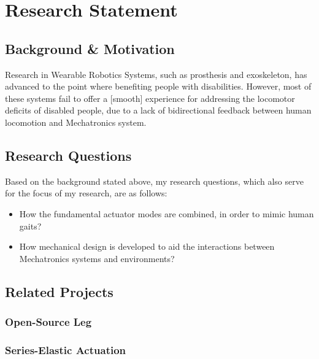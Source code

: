 \documentclass[12pt]{article}
\begin{document}
\tableofcontents

\newpage


\section{Research Statement}

    \subsection{Background \& Motivation}

    Research in Wearable Robotics Systems, such as prosthesis and exoskeleton, has advanced to the point where benefiting people with disabilities. However, most of these systems fail to offer a [smooth] experience for addressing the locomotor deficits of disabled people, due to a lack of bidirectional feedback between human locomotion and Mechatronics system. 

    

    \subsection{Research Questions}
        Based on the background stated above, my research questions, which also serve for the focus of my research, are as follows:
        \begin{itemize}
                
                \item {How the fundamental actuator modes are combined, in order to mimic human gaits?}
                \item {How mechanical design is developed to aid the interactions between Mechatronics systems and environments?}
        
        \end{itemize}
        

    \subsection{Related Projects}

        \subsubsection{Open-Source Leg}
            
            \subsubsection{Series-Elastic Actuation}
\end{document}
